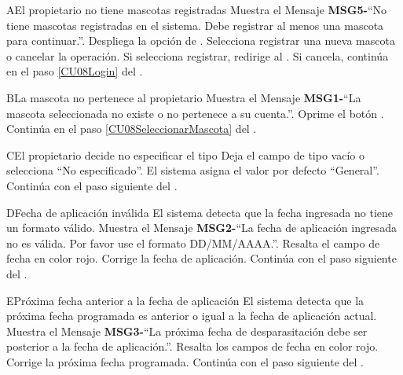 \begin{UCtrayectoriaA}{A}{El propietario no tiene mascotas registradas}
    \UCpaso Muestra el Mensaje {\bf MSG5-}``No tiene mascotas registradas en el sistema. Debe registrar al menos una mascota para continuar.''.
    \UCpaso Despliega la opción de .
    \UCpaso[\UCactor] Selecciona registrar una nueva mascota o cancelar la operación.
    \UCpaso Si selecciona registrar, redirige al .
    \UCpaso Si cancela, continúa en el paso \ref{CU08Login} del .
\end{UCtrayectoriaA}

\begin{UCtrayectoriaA}{B}{La mascota no pertenece al propietario}
    \UCpaso Muestra el Mensaje {\bf MSG1-}``La mascota seleccionada no existe o no pertenece a su cuenta.''.
    \UCpaso[\UCactor] Oprime el botón .
    \UCpaso Continúa en el paso \ref{CU08SeleccionarMascota} del .
\end{UCtrayectoriaA}

\begin{UCtrayectoriaA}{C}{El propietario decide no especificar el tipo}
    \UCpaso[\UCactor] Deja el campo de tipo vacío o selecciona ``No especificado''.
    \UCpaso El sistema asigna el valor por defecto ``General''.
    \UCpaso Continúa con el paso siguiente del .
\end{UCtrayectoriaA}

\begin{UCtrayectoriaA}{D}{Fecha de aplicación inválida}
    \UCpaso El sistema detecta que la fecha ingresada no tiene un formato válido.
    \UCpaso Muestra el Mensaje {\bf MSG2-}``La fecha de aplicación ingresada no es válida. Por favor use el formato DD/MM/AAAA.''.
    \UCpaso Resalta el campo de fecha en color rojo.
    \UCpaso[\UCactor] Corrige la fecha de aplicación.
    \UCpaso Continúa con el paso siguiente del .
\end{UCtrayectoriaA}

\begin{UCtrayectoriaA}{E}{Próxima fecha anterior a la fecha de aplicación}
    \UCpaso El sistema detecta que la próxima fecha programada es anterior o igual a la fecha de aplicación actual.
    \UCpaso Muestra el Mensaje {\bf MSG3-}``La próxima fecha de desparasitación debe ser posterior a la fecha de aplicación.''.
    \UCpaso Resalta los campos de fecha en color rojo.
    \UCpaso[\UCactor] Corrige la próxima fecha programada.
    \UCpaso Continúa con el paso siguiente del .
\end{UCtrayectoriaA}

